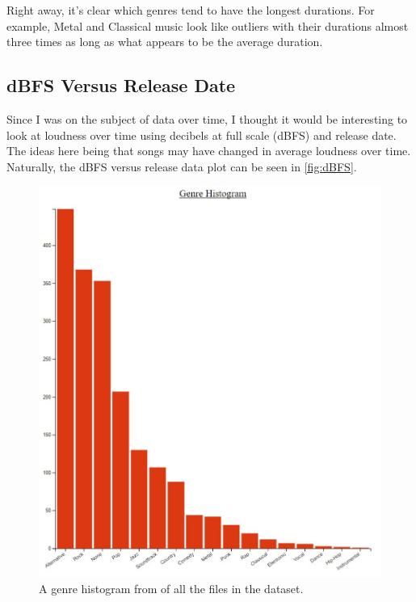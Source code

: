 \documentclass[journal]{vgtc}                %
\begin{document}
Right away, it's clear which genres tend to have the longest durations. For
example, Metal and Classical music look like outliers with their durations
almost three times as long as what appears to be the average duration.

\subsection{dBFS Versus Release Date}

Since I was on the subject of data over time, I thought it would be interesting
to look at loudness over time using decibels at full scale (dBFS) and release
date. The ideas here being that songs may have changed in average loudness over
time. Naturally, the dBFS versus release data plot can be seen in
\autoref{fig:dBFS}.

\begin{figure}[h]
 \centering %
 \includegraphics[width=\columnwidth]{genre-histogram}
 \caption{A genre histogram from \cite{Grifski:2019} of all the files in the dataset.}
 \label{fig:dBFS}
\end{figure}
\end{document}
